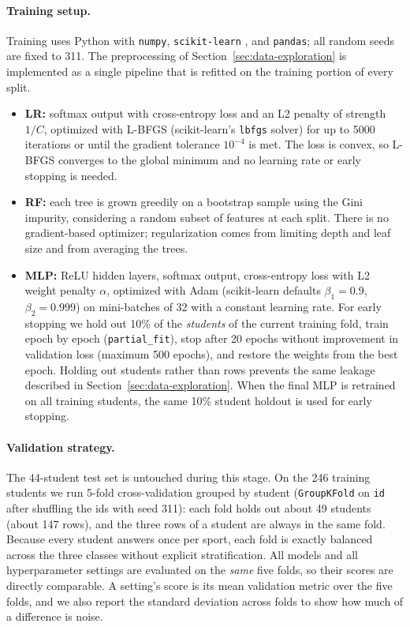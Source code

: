 \documentclass[11pt,letterpaper]{article}
\begin{document}
\paragraph{Training setup.}
Training uses Python with \texttt{numpy}, \texttt{scikit-learn}
\cite{pedregosa2011}, and \texttt{pandas}; all random seeds are fixed to 311. The
preprocessing of Section~\ref{sec:data-exploration} is implemented as a single
pipeline that is refitted on the training portion of every split.
\begin{itemize}
\item \textbf{LR:} softmax output with cross-entropy loss and an L2 penalty of
strength $1/C$, optimized with L-BFGS (scikit-learn's \texttt{lbfgs} solver) for
up to 5000 iterations or until the gradient tolerance $10^{-4}$ is met. The loss is
convex, so L-BFGS converges to the global minimum and no learning rate or early
stopping is needed.
\item \textbf{RF:} each tree is grown greedily on a bootstrap sample using the Gini
impurity, considering a random subset of features at each split. There is no
gradient-based optimizer; regularization comes from limiting depth and leaf size
and from averaging the trees.
\item \textbf{MLP:} ReLU hidden layers, softmax output, cross-entropy loss with L2
weight penalty $\alpha$, optimized with Adam \cite{kingma2015} (scikit-learn
defaults $\beta_1 = 0.9$, $\beta_2 = 0.999$) on mini-batches of 32 with a constant
learning rate. For early stopping we hold out 10\% of the \emph{students} of the
current training fold, train epoch by epoch (\texttt{partial\_fit}), stop after 20
epochs without improvement in validation loss (maximum 500 epochs), and restore the
weights from the best epoch. Holding out students rather than rows prevents the
same leakage described in Section~\ref{sec:data-exploration}. When the final MLP is
retrained on all training students, the same 10\% student holdout is used for early
stopping.
\end{itemize}

\paragraph{Validation strategy.}
The 44-student test set is untouched during this stage. On the 246 training
students we run 5-fold cross-validation grouped by student (\texttt{GroupKFold} on
\texttt{id} after shuffling the ids with seed 311): each fold holds out about 49
students (about 147 rows), and the three rows of a student are always in the same
fold. Because every student answers once per sport, each fold is exactly balanced
across the three classes without explicit stratification. All models and all
hyperparameter settings are evaluated on the \emph{same} five folds, so their
scores are directly comparable. A setting's score is its mean validation metric
over the five folds, and we also report the standard deviation across folds to
show how much of a difference is noise.
\end{document}
